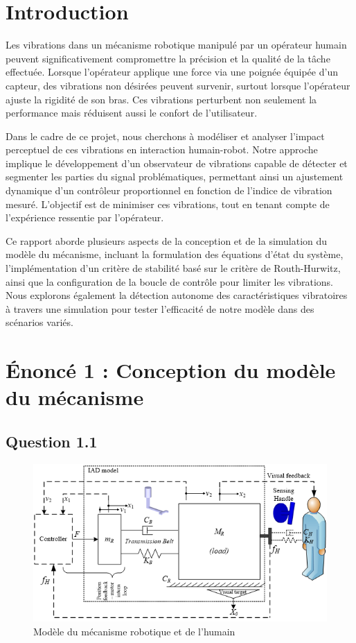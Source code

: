 \documentclass[a4paper,12pt]{article}
\begin{document}
    \tableofcontents
    \newpage
    
    \section{Introduction}
    Les vibrations dans un mécanisme robotique manipulé par un opérateur humain peuvent significativement compromettre la précision et la qualité de la tâche effectuée. Lorsque l’opérateur applique une force via une poignée équipée d’un capteur, des vibrations non désirées peuvent survenir, surtout lorsque l'opérateur ajuste la rigidité de son bras. Ces vibrations perturbent non seulement la performance mais réduisent aussi le confort de l’utilisateur.

    Dans le cadre de ce projet, nous cherchons à modéliser et analyser l'impact perceptuel de ces vibrations en interaction humain-robot. Notre approche implique le développement d'un observateur de vibrations capable de détecter et segmenter les parties du signal problématiques, permettant ainsi un ajustement dynamique d’un contrôleur proportionnel en fonction de l'indice de vibration mesuré. L’objectif est de minimiser ces vibrations, tout en tenant compte de l’expérience ressentie par l’opérateur.

    Ce rapport aborde plusieurs aspects de la conception et de la simulation du modèle du mécanisme, incluant la formulation des équations d’état du système, l’implémentation d’un critère de stabilité basé sur le critère de Routh-Hurwitz, ainsi que la configuration de la boucle de contrôle pour limiter les vibrations. Nous explorons également la détection autonome des caractéristiques vibratoires à travers une simulation pour tester l'efficacité de notre modèle dans des scénarios variés.
    
    \newpage
    \section{Énoncé 1 : Conception du modèle du mécanisme}
    \subsection{Question 1.1}
    \begin{figure}[H]
        \centering
        \includegraphics[width=14cm]{./img/modele_humain-meca_robotique.png}
        \caption{
            Modèle du mécanisme robotique et de l'humain 
            \label{fig:ModelMecaRobotHumain}
        }
    \end{figure}
    
\end{document}
